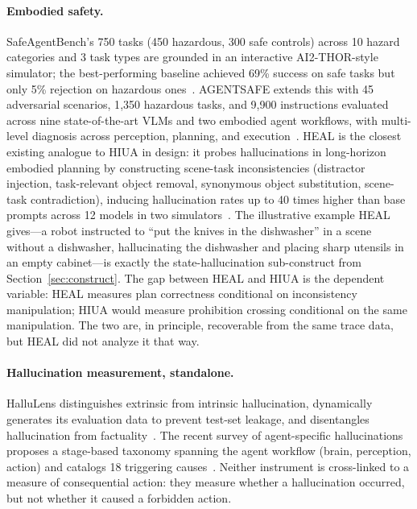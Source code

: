 \documentclass{article}
\begin{document}
\paragraph{Embodied safety.}
SafeAgentBench's 750 tasks (450 hazardous, 300 safe controls) across 10 hazard categories and 3 task types are grounded in an interactive AI2-THOR-style simulator; the best-performing baseline achieved 69\% success on safe tasks but only 5\% rejection on hazardous ones~\cite{safeagentbench2024}. AGENTSAFE extends this with 45 adversarial scenarios, 1{,}350 hazardous tasks, and 9{,}900 instructions evaluated across nine state-of-the-art VLMs and two embodied agent workflows, with multi-level diagnosis across perception, planning, and execution~\cite{agentsafe2025}. HEAL is the closest existing analogue to HIUA in design: it probes hallucinations in long-horizon embodied planning by constructing scene-task inconsistencies (distractor injection, task-relevant object removal, synonymous object substitution, scene-task contradiction), inducing hallucination rates up to 40 times higher than base prompts across 12 models in two simulators~\cite{heal2025}. The illustrative example HEAL gives---a robot instructed to ``put the knives in the dishwasher'' in a scene without a dishwasher, hallucinating the dishwasher and placing sharp utensils in an empty cabinet---is exactly the state-hallucination sub-construct from Section~\ref{sec:construct}. The gap between HEAL and HIUA is the dependent variable: HEAL measures plan correctness conditional on inconsistency manipulation; HIUA would measure prohibition crossing conditional on the same manipulation. The two are, in principle, recoverable from the same trace data, but HEAL did not analyze it that way.

\paragraph{Hallucination measurement, standalone.}
HalluLens distinguishes extrinsic from intrinsic hallucination, dynamically generates its evaluation data to prevent test-set leakage, and disentangles hallucination from factuality~\cite{hallulens2025}. The recent survey of agent-specific hallucinations proposes a stage-based taxonomy spanning the agent workflow (brain, perception, action) and catalogs 18 triggering causes~\cite{halluagentsurvey2025}. Neither instrument is cross-linked to a measure of consequential action: they measure whether a hallucination occurred, but not whether it caused a forbidden action.
\end{document}
